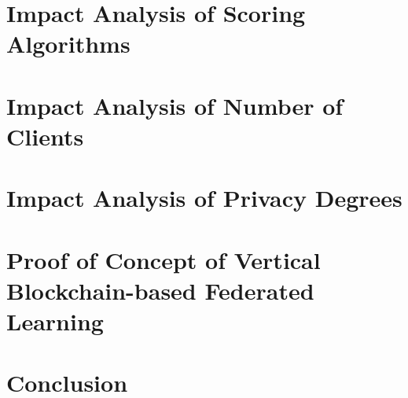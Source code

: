 \documentclass[12pt,a4paper,oneside]{book}
\begin{document}
\chapter{Impact Analysis of Scoring Algorithms}\label{chapter:analysis:scoring}


\chapter{Impact Analysis of Number of Clients}\label{chapter:analysis:clients}


\chapter{Impact Analysis of Privacy Degrees}\label{chapter:analysis:privacy}


\chapter{Proof of Concept of Vertical Blockchain-based Federated Learning}\label{chapter:vertical}


\chapter{Conclusion}\label{chapter:conclusion}






\end{document}
